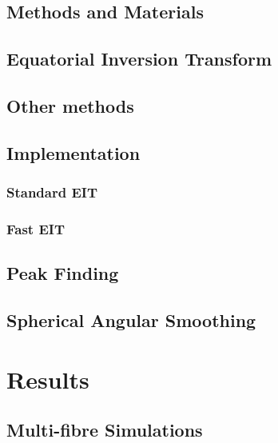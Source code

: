 \documentclass{bioinfo}
\begin{document}
\begin{methods}

\section{Methods and Materials}

\subsection{Equatorial Inversion Transform}

\subsection{Other methods}

\subsection{Implementation }

\subsubsection{Standard EIT\label{sub:Standard-EIT}}

\subsubsection{Fast EIT}

\subsection{Peak Finding\label{sub:Peak-Finding}}

\subsection{Spherical Angular Smoothing\label{sub:Spherical-Angular-Smoothing}}

\end{methods}

\section{Results}

\subsection{Multi-fibre Simulations\label{sub:Multi-fiber-Simulations}}
\end{document}
